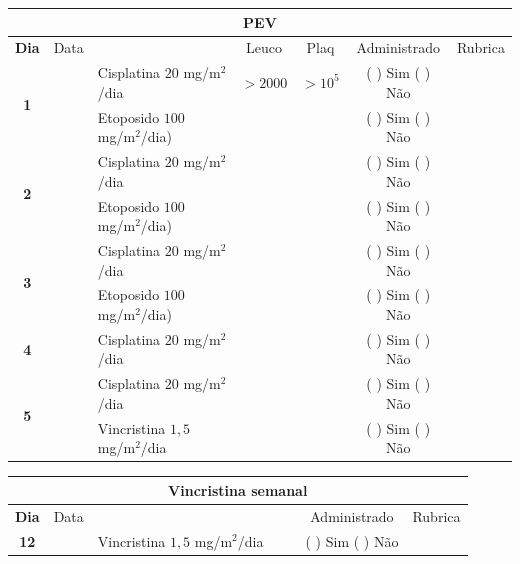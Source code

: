 \documentclass[11pt,a4paper,oldfontcommands]{memoir}
\begin{document}
\begin{center}
\begin{table}[H] \small
\begin{tabular}{p{1cm}c|p{4cm}|p{2cm}p{2cm}|c|c}
	\hline
	\multicolumn{7}{c}{PEV} \\
	\hline
	\multicolumn{1}{c|}{\multirow{1}{*}{\textbf{Dia}}}&{Data}&{}&\multicolumn{1}{c|}{Leuco}&\multicolumn{1}{c|}{Plaq}&{Administrado}&{Rubrica} \\
    \hline
    \multicolumn{1}{c|}{\multirow{2}{*}{\textbf{1}}}&\multirow{2}{*}{}&{Cisplatina \(20\) mg/m\(^2\)/dia}&\multicolumn{1}{c|}{\(>2000\)}&\multicolumn{1}{c|}{\(>10^5\)}&{(  ) Sim (  ) Não}&\\
    \cline{4-5}
    \multicolumn{1}{c|}{}&&{Etoposido \(100\) mg/m\(^2\)/dia)}&\multicolumn{1}{c|}{}&&{(  ) Sim (  ) Não}&\\
    \cline{2-6}
    \multicolumn{1}{c|}{\multirow{2}{*}{\textbf{2}}}&\multirow{2}{*}{}&{Cisplatina \(20\) mg/m\(^2\)/dia}&{}&&{(  ) Sim (  ) Não}&\\
    \multicolumn{1}{c|}{}&&{Etoposido \(100\) mg/m\(^2\)/dia)}&&&{(  ) Sim (  ) Não}&\\
    \cline{2-3}\cline{6-6}
    \multicolumn{1}{c|}{\multirow{2}{*}{\textbf{3}}}&\multirow{2}{*}{}&{Cisplatina \(20\) mg/m\(^2\)/dia}&{}&&{(  ) Sim (  ) Não}&\\
    \multicolumn{1}{c|}{}&&{Etoposido \(100\) mg/m\(^2\)/dia)}&&&{(  ) Sim (  ) Não}&\\
    \cline{2-3}\cline{6-6}
    \multicolumn{1}{c|}{\multirow{1}{*}{{\textbf{4}}}}&{}&{Cisplatina \(20\) mg/m\(^2\)/dia}&{}&&{(  ) Sim (  ) Não}&\\
    \cline{2-3}\cline{6-6}
    \multicolumn{1}{c|}{\multirow{2}{*}{\textbf{5}}}&\multirow{2}{*}{}&{Cisplatina \(20\) mg/m\(^2\)/dia}&{}&&{(  ) Sim (  ) Não}&\\
    \multicolumn{1}{c|}{}&&{Vincristina \(1,5\) mg/m\(^2\)/dia}&&&{(  ) Sim (  ) Não}&\\
    \hline
\end{tabular}
\end{table}
\begin{table}[H] \small
\begin{tabular}{p{1cm}c|p{4cm}|p{2cm}p{2cm}|c|c}
	\hline
	\multicolumn{7}{c}{Vincristina semanal} \\
	\hline
	\multicolumn{1}{c|}{\multirow{1}{*}{\textbf{Dia}}}&{Data}&{}&{}&&{Administrado}&{Rubrica} \\
    \hline
    \multicolumn{1}{c|}{\textbf{12}}&&{Vincristina \(1,5\) mg/m\(^2\)/dia}&\multicolumn{1}{c}{}&&{(  ) Sim (  ) Não}&\\

\end{tabular}
\end{table}
\end{center}
\end{document}
